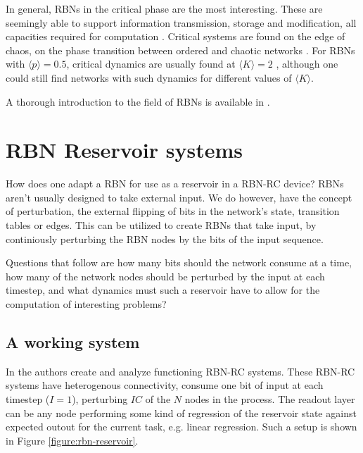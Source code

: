 In general, RBNs in the critical phase are the most interesting.
These are seemingly able to support information transmission, storage and modification,
all capacities required for computation \cite{langton3computation}.
Critical systems are found on the edge of chaos,
on the phase transition between ordered and chaotic networks \cite{gershenson2004introduction}.
For RBNs with $\langle p \rangle = 0.5$,
critical dynamics are usually found at $\langle K \rangle = 2$ \cite{gershenson2004introduction},
although one could still find networks with such dynamics for different values of $\langle K \rangle$.

A thorough introduction to the field of RBNs is available in \cite{gershenson2004introduction}.

\section{RBN Reservoir systems}
\label{subsection:rbn-reservoir-systems}

How does one adapt a RBN for use as a reservoir in a RBN-RC device?
RBNs aren't usually designed to take external input.
We do however, have the concept of perturbation,
the external flipping of bits in the network's state,
transition tables or edges.
This can be utilized to create RBNs that take input,
by continiously perturbing the RBN nodes by the bits of the input sequence.

Questions that follow are how many bits should the network consume at a time,
how many of the network nodes should be perturbed by the input at each timestep,
and what dynamics must such a reservoir have to allow for the computation of interesting problems?

\subsection{A working system}

In \cite{rbn-reservoir} the authors create and analyze functioning RBN-RC systems.
These RBN-RC systems have heterogenous connectivity,
consume one bit of input at each timestep ($I=1$),
perturbing $IC$ of the $N$ nodes in the process.
The readout layer can be any node performing some kind of regression of the reservoir state against expected outout for the current task, e.g. linear regression.
Such a setup is shown in Figure \ref{figure:rbn-reservoir}.

